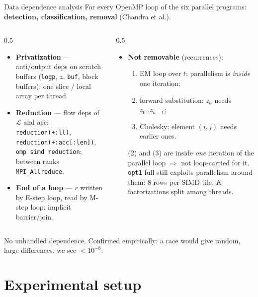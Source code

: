 \documentclass[aspectratio=169,10pt]{beamer}
\newcommand{\optone}{\texttt{opt1}}
\newcommand{\takeaway}[1]{\begin{center}\colorbox{accent!10}{\parbox{0.92\textwidth}{\centering\small #1}}\end{center}}
\begin{document}
\begin{frame}{Data dependence analysis}
\footnotesize
For every OpenMP loop of the six parallel programs: \textbf{detection, classification, removal} (Chandra et al.).
\begin{columns}[T]
\begin{column}{0.5\textwidth}
\begin{itemize}
\item \textbf{Privatization} --- anti/output deps on scratch buffers (\texttt{logp}, $z$, \texttt{buf}, block buffers): one slice / local array per thread.
\item \textbf{Reduction} --- flow deps of $\mathcal{L}$ and acc: \texttt{reduction(+:ll)}, \texttt{reduction(+:acc[:len])}, \texttt{omp simd reduction}; between ranks \texttt{MPI\_Allreduce}.
\item \textbf{End of a loop} --- $r$ written by E-step loop, read by M-step loop: implicit barrier/join.
\end{itemize}
\end{column}
\begin{column}{0.5\textwidth}
\begin{itemize}
\item \textbf{Not removable} (recurrences):
  \begin{enumerate}
  \item EM loop over $t$: parallelism is \emph{inside} one iteration;
  \item forward substitution: $z_a$ needs $z_0..z_{a-1}$;
  \item Cholesky: element $(i,j)$ needs earlier ones.
  \end{enumerate}
  (2) and (3) are inside \emph{one} iteration of the parallel loop $\Rightarrow$ not loop-carried for it. \optone{} full still exploits parallelism around them: 8 rows per SIMD tile, $K$ factorizations split among threads.
\end{itemize}
\end{column}
\end{columns}
\takeaway{No unhandled dependence. Confirmed empirically: a race would give random, large differences, we see $<10^{-8}$.}
\end{frame}

\section{Experimental setup}
\end{document}
